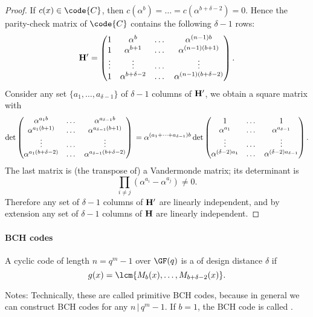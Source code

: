 \documentclass[a4paper, 11pt, openany]{book}
\begin{document}
\begin{proof}
If $c(x) \in \code{C}$, then  $c(\alpha^b) = \dots = c(\alpha^{b + \delta - 2}) = 0$. Hence the parity-check matrix of $\code{C}$ contains the following $\delta - 1$ rows:
\[
	{\bf H}' = \begin{pmatrix}
	1 & \alpha^b &  \dots & \alpha^{(n-1)b}\\
	1 & \alpha^{b+1}  & \dots & \alpha^{(n-1)(b+1)}\\
	\vdots & \vdots & \dots & \vdots\\
	1 & \alpha^{b + \delta -2} & \dots & \alpha^{(n-1)(b + \delta-2)}
	\end{pmatrix}.
\]
Consider any set $\{ a_1, \dots, a_{\delta - 1} \}$ of $\delta - 1$ columns of ${\bf H}'$, we obtain a square matrix with
\[
	\det \begin{pmatrix}
	\alpha^{a_1 b} &  \dots & \alpha^{a_{\delta-1} b}\\
	\alpha^{a_1 (b+1)} & \dots & \alpha^{ a_{\delta-1} (b+1)}\\
	\vdots & \dots & \vdots\\
	\alpha^{a_1 (b + \delta -2) } & \dots & \alpha^{a_{\delta-1} (b + \delta -2)}
	\end{pmatrix}\\
	= \alpha^{(a_1 + \dots + a_{\delta-1})b} \det \begin{pmatrix}
	1 &  \dots & 1\\
	\alpha^{a_1} & \dots & \alpha^{a_{\delta-1}}\\
	\vdots & \dots & \vdots\\
	\alpha^{(\delta -2) a_1} & \dots & \alpha^{(\delta-2) a_{\delta-1}}
	\end{pmatrix}.
\]
The last matrix is (the transpose of) a Vandermonde matrix; its determinant is
\[
    \prod_{i \ne j} (\alpha^{a_i} - \alpha^{a_j}) \ne 0.
\]
Therefore any set of $\delta - 1$ columns of ${\bf H}'$ are linearly independent, and by extension any set of $\delta - 1$ columns of ${\bf H}$ are linearly independent.
\end{proof}


\paragraph{BCH codes}
A cyclic code of length $n = q^m - 1$ over $\GF(q)$ is a  of design distance $\delta$ if
$$
	g(x) = \lcm \{ M_b(x), \dots, M_{b + \delta - 2}(x) \}.
$$

Notes: Technically, these are called primitive BCH codes, because in general we can construct BCH codes for any $n \, | \, q^m-1$. If $b=1$, the BCH code is called .
\end{document}
